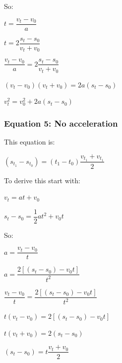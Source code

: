 So:

\(t=\dfrac{v_t-v_0}{a}\)

\(t=2\dfrac{s_t-s_0}{v_t+v_0}\)

\(\dfrac{v_t-v_0}{a}=2\dfrac{s_t-s_0}{v_t+v_0}\)

\((v_t-v_0)(v_t+v_0)=2a(s_t-s_0)\)

\(v^2_t= v^2_0+2a(s_t-s_0)\)
\subsubsection{Equation 5: No acceleration}

This equation is:

\((s_{t_1}-s_{t_0})=(t_1-t_0)\dfrac{v_{t_1}+v_{t_1}}{2}\)

To derive this start with:

\(v_t=at+v_0\)

\(s_t-s_0=\dfrac{1}{2}at^2+v_0t\)

So:

\(a=\dfrac{v_t-v_0}{t}\)

\(a=\dfrac{2[(s_t-s_0)-v_0t]}{t^2}\)

\(\dfrac{v_t-v_0}{t}=\dfrac{2[(s_t-s_0)-v_0t]}{t^2}\)

\(t(v_t-v_0)=2[(s_t-s_0)-v_0t]\)

\(t(v_t+v_0)=2(s_t-s_0)\)

\((s_t-s_0)=t\dfrac{v_t+v_0}{2}\)


